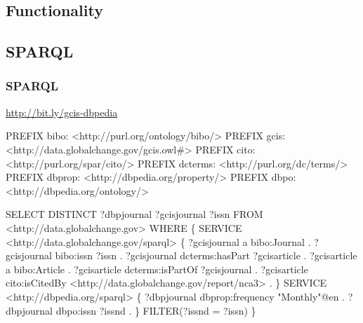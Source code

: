 \documentclass{beamer}
\begin{document}
\subsection{Functionality}

\subsection{SPARQL}
\begin{frame}[fragile]
    \frametitle{SPARQL}
     \url{http://bit.ly/gcis-dbpedia}
\begin{tiny}
\begin{semiverbatim}
    PREFIX bibo: <http://purl.org/ontology/bibo/>
    PREFIX gcis: <http://data.globalchange.gov/gcis.owl#>
    PREFIX cito: <http://purl.org/spar/cito/>
    PREFIX dcterms: <http://purl.org/dc/terms/>
    PREFIX dbprop: <http://dbpedia.org/property/>
    PREFIX dbpo: <http://dbpedia.org/ontology/>

    SELECT  DISTINCT ?dbpjournal ?gcisjournal ?issn
    FROM <http://data.globalchange.gov>
    WHERE \{
        SERVICE <http://data.globalchange.gov/sparql> \{
            ?gcisjournal a bibo:Journal .
            ?gcisjournal bibo:issn ?issn .
            ?gcisjournal dcterms:hasPart ?gcisarticle .
            ?gcisarticle a bibo:Article .
            ?gcisarticle dcterms:isPartOf ?gcisjournal .
            ?gcisarticle cito:isCitedBy <http://data.globalchange.gov/report/nca3> .
         \}
       SERVICE <http://dbpedia.org/sparql> \{
        ?dbpjournal dbprop:frequency "Monthly"@en .
        ?dbpjournal dbpo:issn ?issnd .
        \}
      FILTER(?issnd = ?issn)
    \}
\end{semiverbatim}
\end{tiny}

\end{frame}
\end{document}
